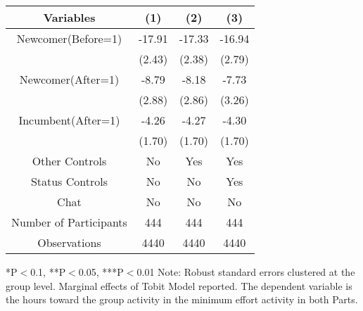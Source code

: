 \begin{table}[htbp]
    \begin{tabular}{c c c c}
    \toprule
    \textbf{Variables} & \textbf{(1)} & \textbf{(2)} & \textbf{(3)}      \\ 
\midrule
Newcomer(Before=1)               &     -17.91\sym{***}    &    -17.33\sym{***}  &  -16.94\sym{***}   \\
                                 &     (2.43)             &     (2.38)          &  (2.79)         \\
\addlinespace
Newcomer(After=1)                &     -8.79\sym{***}     &     -8.18\sym{***}   &  -7.73          \\
                                 &     (2.88)             &     (2.86)           &  (3.26)         \\
\addlinespace
Incumbent(After=1)               &     -4.26\sym{**}      &     -4.27\sym{**}  &  -4.30\sym{**}     \\
                                 &     (1.70)             &     (1.70)         &  (1.70)         \\
\midrule
Other Controls                   &    No                  &    Yes              &    Yes             \\
Status Controls                    &    No                  &    No               &    Yes             \\
Chat                             &    No                  &    No               &    No               \\
\midrule
Number of Participants           &    444               &    444              &    444               \\
\midrule
Observations                     &       4440          &       4440          &  4440          \\
\bottomrule

\end{tabular}
\begin{footnotesize}
\newline
*P$<$0.1, **P$<$0.05, ***P$<$0.01
\newline
Note: Robust standard errors clustered at the group level. Marginal effects of Tobit Model reported. 
\newline
The dependent variable is the hours toward the group activity in the minimum effort activity in both Parts. 
\end{footnotesize}
\end{table}